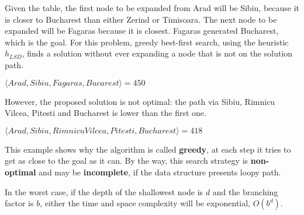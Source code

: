 \begin{example}
    Given the table, the first node to be expanded from Arad will be Sibiu, because it is closer to Bucharest than either Zerind or Timisoara. The next node to be expanded
    will be Fagaras because it is closest. Fagaras generated Bucharest, which is the goal. For this problem, greedy best-first search, using the heuristic $h_{LSD}$, finds 
    a solution without ever expanding a node that is not on the solution path. \vspace{3.5pt} 

    \begin{center}
        $\langle Arad, Sibiu, Fagaras, Bucarest\rangle = 450$
    \end{center} \vspace{3.5pt}

    However, the proposed solution is not optimal: the path via Sibiu, Rimnicu Vilcea, Pitesti and Bucharest is lower than the first one. \vspace{3.5pt}

    \begin{center}
        $\langle Arad, Sibiu, Rimnicu Vilcea, Pitesti, Bucharest\rangle = 418$
    \end{center} \vspace{3.5pt}
\end{example}
This example shows why the algorithm is called \textbf{greedy}, at each step it tries to get as close to the goal as it can. By the way, this search strategy is \textbf{non-optimal}
and may be \textbf{incomplete}, if the data structure presents loopy path. \vspace{3.5pt}

In the worst case, if the depth of the shallowest node is $d$ and the branching factor is $b$, either the time and space complexity will be exponential, $O(b^d)$.